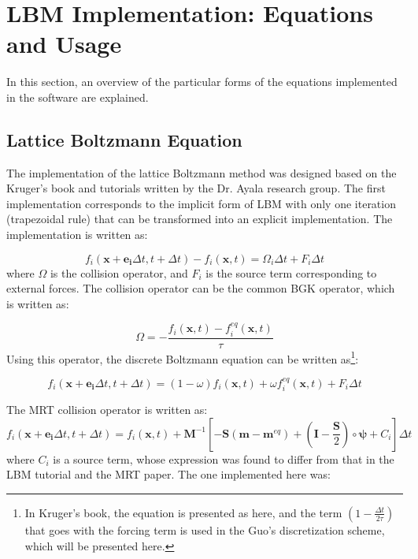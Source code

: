\documentclass{article}
\begin{document}
	\newpage
	
	\section{LBM Implementation: Equations and Usage}
	In this section, an overview of the particular forms of the equations implemented in the software are explained.
	
	
	\subsection{Lattice Boltzmann Equation}
	
	The implementation of the lattice Boltzmann method was designed  based on the Kruger's book and tutorials written by the Dr. Ayala research group. The first implementation corresponds to the implicit form of LBM with only one iteration (trapezoidal rule) that can be transformed into an explicit implementation. The implementation is written as:
	
	\begin{equation}
		f_i(\mathbf{x}+\mathbf{e_i}\Delta t, t+ \Delta t) - f_i(\mathbf{x}, t) = \Omega_i \Delta t+ F_i \Delta t
	\end{equation}
	where $\Omega$ is the collision operator, and $F_i$ is the source term corresponding to external forces. The collision operator can be the common BGK operator, which is written as:
	
	\begin{equation}
		\Omega = - \frac{f_i(\mathbf{x}, t) - f_i^{eq}(\mathbf{x}, t) }{\tau}
	\end{equation}
	Using this operator, the discrete Boltzmann equation can be written as\footnote{In Kruger's book, the equation is presented as here, and the term $(1-\frac{\Delta t}{2 \tau})$ that goes with the forcing term is used in the Guo's discretization scheme, which will be presented here.}:
	
	\begin{equation}
		f_i(\mathbf{x}+\mathbf{e_i}\Delta t, t+ \Delta t) = (1- \omega) f_i(\mathbf{x}, t) +  \omega  f_i^{eq}(\mathbf{x}, t) + F_i \Delta t
	\end{equation}
	
	The MRT collision operator is written as:
	\begin{equation}
		f_i(\mathbf{x}+\mathbf{e_i}\Delta t, t+ \Delta t) = f_i(\mathbf{x}, t) + \mathbf{M}^{-1} [-\mathbf{S} (\mathbf{m}-\mathbf{m}^{eq}) + (\mathbf{I}-\frac{\mathbf{S}}{2}) \circ \mathbf{\psi} + C_i] \Delta t
	\end{equation}
	where $C_i$ is a source term, whose expression was found to differ from that in the LBM tutorial and the MRT paper. The one implemented here was:
	
\end{document}
